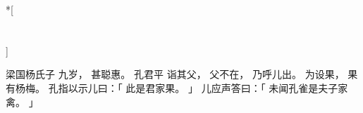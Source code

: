 
\switchcolumn[0]*[\section{}]

梁国杨氏子
九岁，
甚聪惠。
孔君平
诣其父，
父不在，
乃呼儿出。
为设果，
果有杨梅。
孔指以示儿曰：「
    此是君家果。
」
儿应声答曰：「
    未闻孔雀是夫子家禽。
」

\switchcolumn



